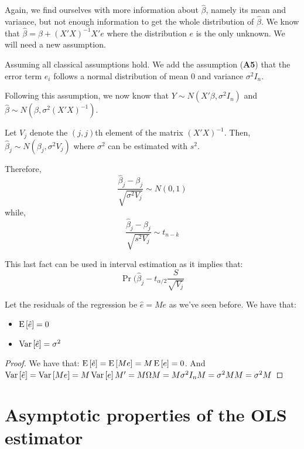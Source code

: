 Again, we find ourselves with more information about $\hat{\beta}$, namely its mean and variance, but not enough information to get the whole distribution of $\hat{\beta}$. We know that $\hat{\beta} = \beta + (X'X)^{-1}X'e$ where the distribution $e$ is the only unknown. We will need a new assumption.
\begin{definition}
Assuming all classical assumptions hold. We add the assumption (\textbf{A5}) that the error term $e_i$ follows a normal distribution of mean $0$ and variance $\sigma^2I_n$.

Following this assumption, we now know that $Y\sim N(X'\beta, \sigma^2 I_n)$ and $\hat{\beta}\sim N(\beta,\sigma^2(X'X)^{-1})$.
\end{definition}

\begin{proposition}
Let $V_j$ denote the $(j,j)$th element of the matrix $(X'X)^{-1}$. Then, $\hat{\beta}_j\sim N(\beta_j, \sigma^2V_j)$ where $\sigma^2$ can be estimated with $s^2$.

Therefore, $$\frac{\hat{\beta}_j -\beta_j}{\sqrt{\sigma^2V_j}}\sim N(0,1)$$ while, $$\frac{\hat{\beta}_j -\beta_j}{\sqrt{s^2V_j}}\sim t_{n-k}$$
\end{proposition}

\begin{definition}
This last fact can be used in interval estimation as it implies that: $$\operatorname{Pr}(\hat{\beta}_j - t_{\alpha /2}\frac{S}{\sqrt{V_j}} $$
\end{definition}

\begin{proposition}
Let the residuals of the regression be $\hat{e} = Me$ as we've seen before. We have that:\begin{itemize}
\item $\operatorname{E}\left[\hat{e}\right] = 0$
\item $\operatorname{Var}\left[\hat{e}\right] = \sigma^2$
\end{itemize}
\end{proposition}
\begin{proof}
We have that: $\operatorname{E}\left[\hat{e}\right] = \operatorname{E}\left[Me\right] = M\operatorname{E}\left[e\right] = 0$. And $\operatorname{Var}\left[\hat{e}\right] = \operatorname{Var}\left[Me\right] = M\operatorname{Var}\left[e\right]M' = M\Omega M = M\sigma^2I_nM = \sigma^2MM = \sigma^2 M$
\end{proof}


\section{Asymptotic properties of the OLS estimator}


